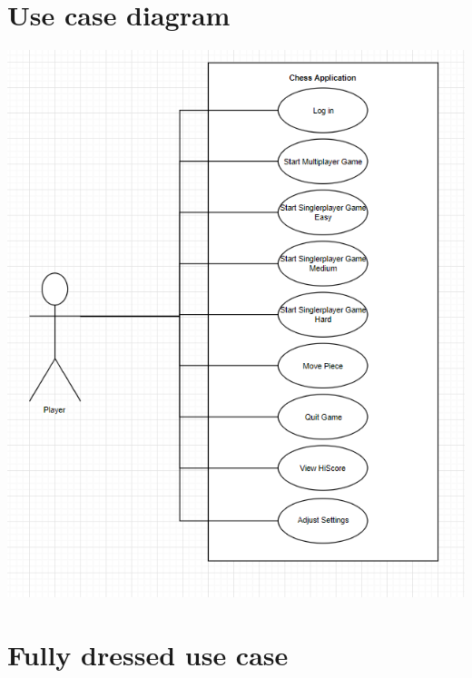 \documentclass[letterpaper,11pt]{article}
\begin{document}
\newpage
\section*{Use case diagram}
\begin{center}
\includegraphics[width=16cm]{Use-Case-Diagram-New.png}
\end{center}
\newpage
\section*{Fully dressed use case}
\end{document}
